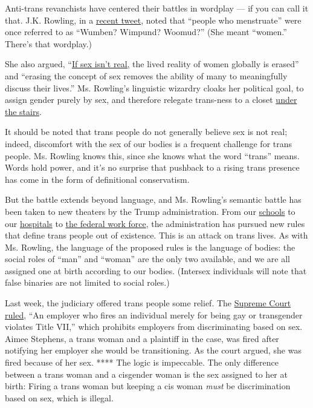 Anti-trans revanchists have centered their battles in wordplay --- if
you can call it that. J.K. Rowling, in a
\href{https://twitter.com/jk_rowling/status/1269382518362509313}{recent
tweet}, noted that ``people who menstruate'' were once referred to as
``Wumben? Wimpund? Woomud?'' (She meant ``women.'' There's that
wordplay.)

She also argued,
``\href{https://twitter.com/jk_rowling/status/1269389298664701952}{If
sex isn't real,} the lived reality of women globally is erased'' and
``erasing the concept of sex removes the ability of many to meaningfully
discuss their lives.'' Ms. Rowling's linguistic wizardry cloaks her
political goal, to assign gender purely by sex, and therefore relegate
trans-ness to a closet
\href{https://harrypotter.fandom.com/wiki/Cupboard_Under_the_Stairs}{under
the stairs}.

It should be noted that trans people do not generally believe sex is not
real; indeed, discomfort with the sex of our bodies is a frequent
challenge for trans people. Ms. Rowling knows this, since she knows what
the word ``trans'' means. Words hold power, and it's no surprise that
pushback to a rising trans presence has come in the form of definitional
conservatism.

But the battle extends beyond language, and Ms. Rowling's semantic
battle has been taken to new theaters by the Trump administration. From
our
\href{https://www.nytimes3xbfgragh.onion/2018/10/21/us/politics/transgender-trump-administration-sex-definition.html}{schools}
to our
\href{https://www.nytimes3xbfgragh.onion/2020/06/12/us/politics/trump-transgender-rights.html}{hospitals}
to
\href{https://www.nytimes3xbfgragh.onion/2019/12/06/us/politics/trump-transgender-rights.html}{the
federal work force}, the administration has pursued new rules that
define trans people out of existence. This is an attack on trans lives.
As with Ms. Rowling, the language of the proposed rules is the language
of bodies: the social roles of ``man'' and ``woman'' are the only two
available, and we are all assigned one at birth according to our bodies.
(Intersex individuals will note that false binaries are not limited to
social roles.)

Last week, the judiciary offered trans people some relief. The
\href{https://www.supremecourt.gov/opinions/19pdf/17-1618_hfci.pdf}{Supreme
Court ruled}, ``An employer who fires an individual merely for being gay
or transgender violates Title VII,'' which prohibits employers from
discriminating based on sex. Aimee Stephens, a trans woman and a
plaintiff in the case, was fired after notifying her employer she would
be transitioning. As the court argued, she was fired because of her sex.
**** The logic is impeccable. The only difference between a trans woman
and a cisgender woman is the sex assigned to her at birth: Firing a
trans woman but keeping a cis woman \emph{must} be discrimination based
on sex, which is illegal.


